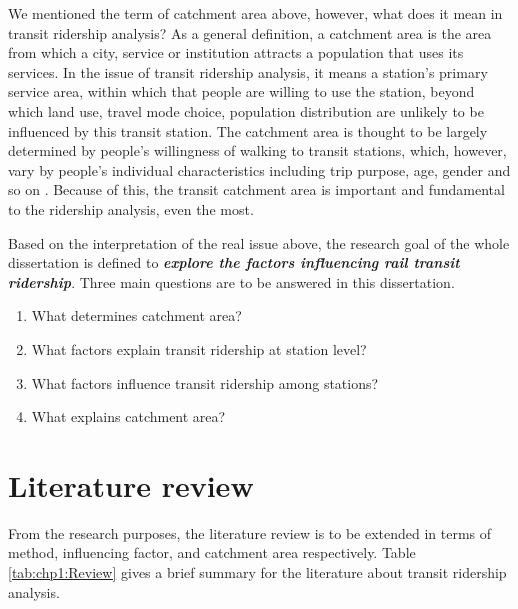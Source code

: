 We mentioned the term of catchment area above, however, what does it mean in transit ridership analysis? As a general definition, a catchment area is the area from which a city, service or institution attracts a population that uses its services. In the issue of transit ridership analysis, it means a station's primary service area, within which that people are willing to use the station, beyond which land use, travel mode choice, population distribution are unlikely to be influenced by this transit station. The catchment area is thought to be largely determined by people's willingness of walking to transit stations, which, however, vary by people's individual characteristics including trip purpose, age, gender and so on \cite{guerra2013half}. Because of this, the transit catchment area is important and fundamental to the ridership analysis, even the most.

Based on the interpretation of the real issue above, the research goal of the whole dissertation is defined to \emph{\textbf{explore the factors influencing rail transit ridership}}. Three main questions are to be answered in this dissertation.

\begin{enumerate}
	\setlength{\parskip}{0\baselineskip} %
	\item What determines catchment area?
	\item What factors explain transit ridership at station level?
	\item What factors influence transit ridership among stations?
	\item What explains catchment area?
	\setlength{\parskip}{0.7\baselineskip} %
\end{enumerate}

%
\section{Literature review} 
From the research purposes, the literature review is to be extended in terms of method, influencing factor, and catchment area respectively. Table \ref{tab:chp1:Review} gives a brief summary for the literature about transit ridership analysis.

